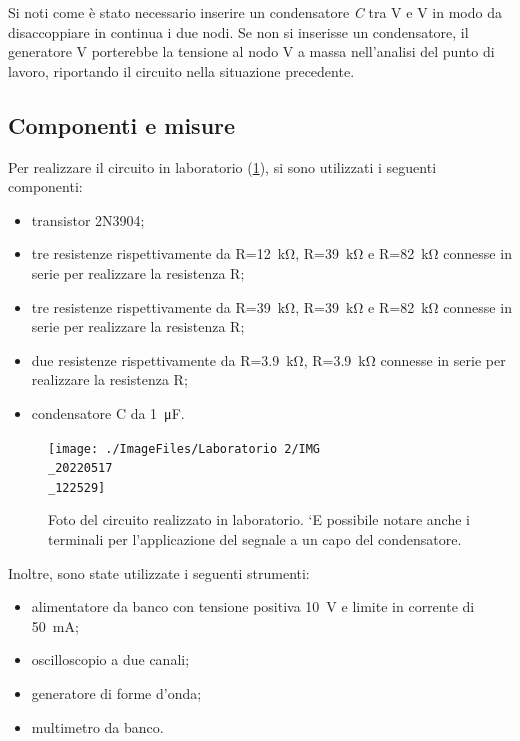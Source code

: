 Si noti come è stato necessario inserire un condensatore \textit{C} tra V e V in modo da disaccoppiare in continua i due nodi. Se non si inserisse un condensatore, il generatore V porterebbe la tensione al nodo V a massa nell'analisi del punto di lavoro, riportando il circuito nella situazione precedente.

\subsection{Componenti e misure}
Per realizzare il circuito in laboratorio (\Fig\ref{fig:emitterfollwer_v2_circuito}), si sono utilizzati i seguenti componenti:
\begin{itemize}
	\item transistor 2N3904;
	\item tre resistenze rispettivamente da R=\SI{12}{\kilo\ohm}, R=\SI{39}{\kilo\ohm} e R=\SI{82}{\kilo\ohm} connesse in serie per realizzare la resistenza R;
	\item tre resistenze rispettivamente da R=\SI{39}{\kilo\ohm}, R=\SI{39}{\kilo\ohm} e R=\SI{82}{\kilo\ohm} connesse in serie per realizzare la resistenza R;
	\item due resistenze rispettivamente da R=\SI{3.9}{\kilo\ohm}, R=\SI{3.9}{\kilo\ohm} connesse in serie per realizzare la resistenza R;
	\item condensatore C da \SI{1}{\micro\farad}.
\end{itemize}

\begin{figure}[h!]
	\centering
	\texttt{[image: ./ImageFiles/Laboratorio 2/IMG\\\_20220517\\\_122529]}
	\caption{Foto del circuito realizzato in laboratorio. `E possibile notare anche i terminali per l'applicazione del segnale a un capo del condensatore.}
	\label{fig:emitterfollwer_v2_circuito}
\end{figure}

Inoltre, sono state utilizzate i seguenti strumenti:
\begin{itemize}
	\item alimentatore da banco con tensione positiva \SI{10}{\volt} e limite in corrente di \SI{50}{\milli\ampere};
	\item oscilloscopio a due canali;
	\item generatore di forme d'onda;
	\item multimetro da banco.
\end{itemize}

